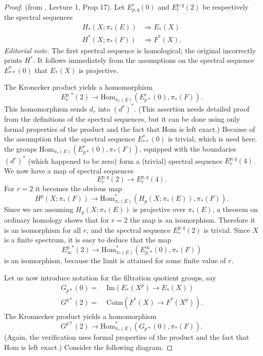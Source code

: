 \documentclass[../main]{subfiles}
\begin{document}
\begin{proof} (from \cite{adams3}, Lecture 1, Prop 17). Let $E^r_{p, q}(0)$ and $E^{p, q}_r(2)$ be respectively the spectral sequences
\begin{align*}H_\ast(X;\pi_\ast(E)) &\Longrightarrow E_\ast(X) \\
H^\ast(X;\pi_\ast(F)) &\Longrightarrow F^\ast(X).
\end{align*}
\noindent\textit{Editorial note.} The first spectral sequence is homological; the original incorrectly prints $H^\ast$.
It follows immediately from the assumptions on the spectral sequence $E^\ast_{\ast \ast}(0)$ that $E_\ast(X)$ is projective.

The Kronecker product yields a homomorphism
\[E_r^{p, \ast}(2) \longrightarrow \text{Hom}_{\pi_\ast(E)}(E^r_{p \ast}(0), \pi_\ast(F)).\]
This homomorphism sends $d_r$ into $\left(d^r\right)^\ast$. (This assertion needs detailed proof from the definitions of the spectral sequences, but it can be done using only formal properties of the product and the fact that Hom is left exact.) Because of the assumption that the spectral sequence $E^\ast_{\ast \ast}(0)$ is trivial, which is used here. the groups $\text{Hom}_{\pi_\ast(E)}(E^r_{p \ast}(0), \pi_\ast(F))$, equipped with the boundaries $\left(d^r\right)^\ast$ (which happened to be zero) form a (trivial) spectral sequence $E^{p, q}_r(4)$. We now have a map of spectral sequences
\[E^{p,q}_r(2) \longrightarrow E^{p,q}_r(4).\]
For $r=2$ it becomes the obvious map
\[H^p(X;\pi_\ast(F)) \longrightarrow \text{Hom}^\ast_{\pi_\ast(E)}(H_p(X;\pi_\ast(E)), \pi_\ast(F)).\]
Since we are assuming $H_p(X;\pi_\ast(E))$ is projective over $\pi_\ast(E)$, a theorem on ordinary homology shows that for $r=2$ the map is an isomorphism. Therefore it is an isomorphism for all $r$, and the spectral sequence $E^{p,q}_r(2)$ is trivial. Since $X$ is a finite spectrum, it is easy to deduce that the map
\[E^{p, \ast}_\infty(2) \longrightarrow \text{Hom}^{\ast}_{\pi_\ast(E)}(E^\infty_{p, \ast}(0), \pi_\ast(F))\]
is an isomorphism, because the limit is attained for some finite value of $r$.

Let us now introduce notation for the filtration quotient groups, say
\begin{align*}
G_{p \ast}(0) =&\; \text{Im}(E_{\ast}(X^p) \longrightarrow E_{\ast}(X)) \\
G^{p \ast}(2) =&\; \text{Coim}(F^{\ast}(X) \longrightarrow F^{\ast}(X^p)).
\end{align*}
The Kronnecker product yields a homomorphism
\[G^{p \ast}(2) \longrightarrow \text{Hom}^{\ast}_{\pi_\ast(E)}(G_{p \ast}(0), \pi_\ast(F)).\]
(Again, the verification uses formal properties of the product and the fact that Hom is left exact.) Consider the following diagram.


\end{proof}
\end{document}
